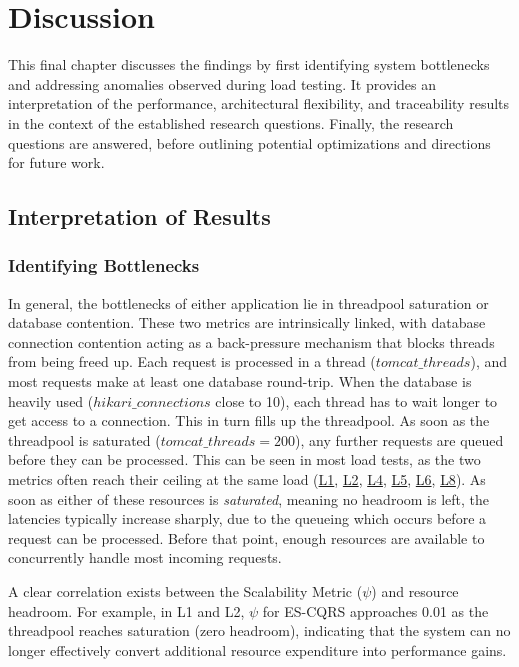 \chapter{Discussion}
\label{ch:discussion}

This final chapter discusses the findings by first identifying system bottlenecks and addressing anomalies observed during load testing. It provides an interpretation of the performance, architectural flexibility, and traceability results in the context of the established research questions. Finally, the research questions are answered, before outlining potential optimizations and directions for future work.

\section{Interpretation of Results}

\subsection{Identifying Bottlenecks}
\label{sec:identifying-bottlenecks}

In general, the bottlenecks of either application lie in threadpool saturation or database contention. These two metrics are intrinsically linked, with database connection contention acting as a back-pressure mechanism that blocks threads from being freed up. Each request is processed in a thread ($tomcat\_threads$), and most requests make at least one database round-trip. When the database is heavily used ($hikari\_connections$ close to 10), each thread has to wait longer to get access to a connection. This in turn fills up the threadpool. As soon as the threadpool is saturated ($tomcat\_threads=200$), any further requests are queued before they can be processed. This can be seen in most load tests, as the two metrics often reach their ceiling at the same load (\hyperref[sec:l1]{L1}, \hyperref[sec:l2]{L2}, \hyperref[sec:l4]{L4}, \hyperref[sec:l5]{L5}, \hyperref[sec:l6]{L6}, \hyperref[sec:l8]{L8}). As soon as either of these resources is \emph{saturated}, meaning no headroom is left, the latencies typically increase sharply, due to the queueing which occurs before a request can be processed. Before that point, enough resources are available to concurrently handle most incoming requests.

A clear correlation exists between the Scalability Metric ($\psi$) and resource headroom. For example, in L1 and L2, $\psi$ for ES-CQRS approaches 0.01 as the threadpool reaches saturation (zero headroom), indicating that the system can no longer effectively convert additional resource expenditure into performance gains.

